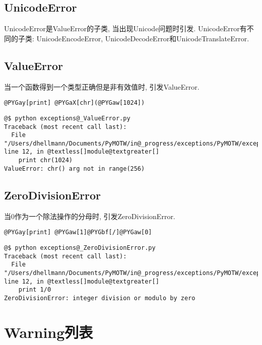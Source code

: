 \documentclass[a4paper,10pt,english]{manual}
\begin{document}
\subsection{UnicodeError}

UnicodeError是ValueError的子类, 当出现Unicode问题时引发. UnicodeError有不同的子类: UnicodeEncodeError, UnicodeDecodeError和UnicodeTranslateError.


\subsection{ValueError}

当一个函数得到一个类型正确但是非有效值时, 引发ValueError.

\begin{Verbatim}[commandchars=@\[\]]
@PYGay[print] @PYGaX[chr](@PYGaw[1024])
\end{Verbatim}

\begin{Verbatim}[commandchars=@\[\]]
@$ python exceptions@_ValueError.py
Traceback (most recent call last):
  File "/Users/dhellmann/Documents/PyMOTW/in@_progress/exceptions/PyMOTW/exceptions/exceptions@_ValueError.py", line 12, in @textless[]module@textgreater[]
    print chr(1024)
ValueError: chr() arg not in range(256)
\end{Verbatim}


\subsection{ZeroDivisionError}

当0作为一个除法操作的分母时, 引发ZeroDivisionError.

\begin{Verbatim}[commandchars=@\[\]]
@PYGay[print] @PYGaw[1]@PYGbf[/]@PYGaw[0]
\end{Verbatim}

\begin{Verbatim}[commandchars=@\[\]]
@$ python exceptions@_ZeroDivisionError.py
Traceback (most recent call last):
  File "/Users/dhellmann/Documents/PyMOTW/in@_progress/exceptions/PyMOTW/exceptions/exceptions@_ZeroDivisionError.py", line 12, in @textless[]module@textgreater[]
    print 1/0
ZeroDivisionError: integer division or modulo by zero
\end{Verbatim}


\section{Warning列表}
\end{document}
